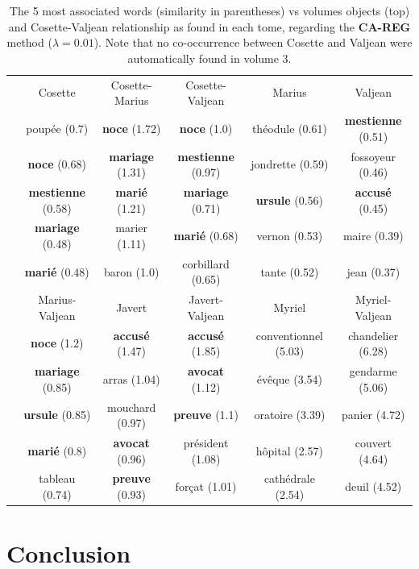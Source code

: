 \documentclass[
twocolumn,
]{ceurart}
\begin{document}
\begin{table}[!h]
	\centering
	\begin{tabular}{|c|c|c|c|c|c|}
		\hline
		\parbox[t]{2mm}{} & Cosette & Cosette-Marius & Cosette-Valjean & Marius & Valjean \\ 
		& poupée (0.7) & \textbf{noce} (1.72) & \textbf{noce} (1.0) & théodule (0.61) & \textbf{mestienne} (0.51) \\
		& \textbf{noce} (0.68) & \textbf{mariage} (1.31) & \textbf{mestienne} (0.97) & jondrette (0.59) & fossoyeur (0.46) \\
		& \textbf{mestienne} (0.58) & \textbf{marié} (1.21) & \textbf{mariage} (0.71) & \textbf{ursule} (0.56) & \textbf{accusé} (0.45) \\
		& \textbf{mariage} (0.48) & marier (1.11) & \textbf{marié} (0.68) & vernon (0.53) & maire (0.39) \\
		& \textbf{marié} (0.48) & baron (1.0) & corbillard (0.65) & tante (0.52) & jean (0.37) \\ 
		& Marius-Valjean & Javert & Javert-Valjean & Myriel & Myriel-Valjean \\
		& \textbf{noce} (1.2) & \textbf{accusé} (1.47) & \textbf{accusé} (1.85) & conventionnel (5.03) & chandelier (6.28) \\
		& \textbf{mariage} (0.85) & arras (1.04) & \textbf{avocat} (1.12) & évêque (3.54) & gendarme (5.06) \\
		& \textbf{ursule} (0.85) & mouchard (0.97) & \textbf{preuve} (1.1) & oratoire (3.39) & panier (4.72) \\
		& \textbf{marié} (0.8) & \textbf{avocat} (0.96) & président (1.08) & hôpital (2.57) & couvert (4.64) \\
		& tableau (0.74) & \textbf{preuve} (0.93) & forçat (1.01) & cathédrale (2.54) & deuil (4.52) \\
		\hline
	\end{tabular}
	\label{CA_TIME_REG_word_vs_obj}
	\caption{The 5 most associated words (similarity in parentheses) vs volumes objects (top) and Cosette-Valjean relationship as found in each tome, regarding the \textbf{CA-REG} method ($\lambda = 0.01$). Note that no co-occurrence between Cosette and Valjean were automatically found in volume 3.}
\end{table}

\section{Conclusion}
\end{document}
